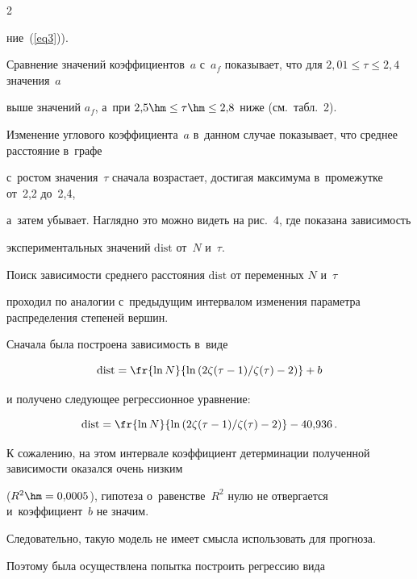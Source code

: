 \begin{multicols}{2}
\noindent

 ние~(\ref{eq3})).

Сравнение значений коэффициентов~$a$ с~$a_f$ показывает, что для $2{,}01\leq\tau\leq 2{,}4$ значения~$a$ 

выше значений $a_f$, а~при $2{,}5\hm\leq\tau\hm\leq 2{,}8$ ниже (см.\ табл.~2).

Изменение углового коэффициента~$a$ в~данном случае показывает, что сред\-нее расстояние в~графе

с~рос\-том значения~$\tau$ сначала возрастает, достигая максимума в~промежутке от~2,2 до~2,4, 

а~затем убывает. На\-гляд\-но это мож\-но видеть на рис.~4, где показана за\-ви\-си\-мость

экспериментальных значений $\mathrm{dist}$ от~$N$ и~$\tau$.











Поиск зависимости среднего расстояния $\mathrm{dist}$ от переменных $N$ и~$\tau$ 

проходил по аналогии с~предыду\-щим интервалом изменения параметра распределения степеней вершин.

Сначала была по\-стро\-ена за\-ви\-си\-мость в~виде 

$$

\mathrm{dist}=\fr{\ln N}{\ln\left({2\zeta(\tau-1)}/{\zeta(\tau)}-2\right)}+b

$$

и получено сле\-ду\-ющее регрессионное уравнение:

\begin{equation*}

\mathrm{dist} = \fr{\ln N}{\ln\left({2\zeta(\tau-1)}/{\zeta(\tau)}-2\right)}-40{,}936\,.

\end{equation*}

К сожалению, на этом интервале коэффициент детерминации полученной за\-ви\-си\-мости оказался очень низким

($R^2\hm=0{,}0005$), гипотеза о~равенстве~$R^2$ нулю не отвергается и~коэффициент~$b$ не значим.

Следовательно, такую модель не имеет смыс\-ла использовать для прогноза.

Поэтому была осуществлена попытка по\-стро\-ить регрессию вида

$$


\end{multicols}
